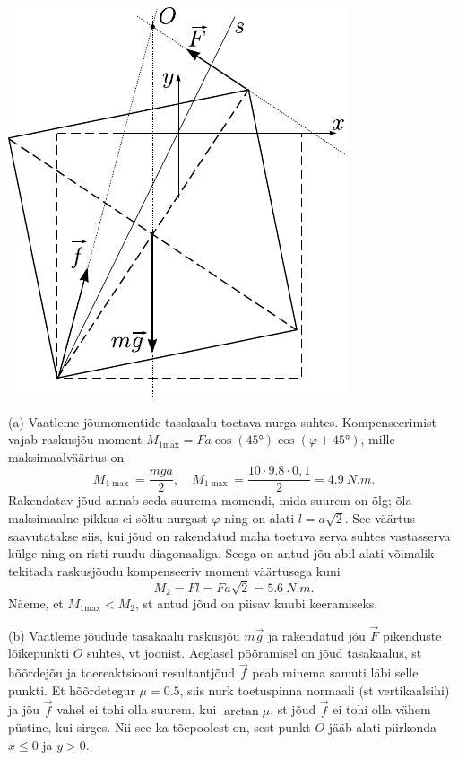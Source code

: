 \documentclass[10pt, twoside]{article}
\begin{document}
{\begin{center}
	\includegraphics[height=0.6\textheight]{2007-v2g-09-lah}
\end{center}

(a) Vaatleme jõumomentide tasakaalu toetava nurga suhtes. Kompenseerimist vajab raskusjõu moment $M_{1 \mathrm{max}} = F a \cos (\ang{45}) \cos (\varphi + \ang{45})$, mille maksimaalväärtus on 
\[
M_{1 \max }=\frac{m g a}{2}, \quad M_{1 \max }=\frac{10 \cdot \num{9,8} \cdot 0,1}{2}=\SI{4,9}{N.m}.
\]
Rakendatav jõud annab seda suurema momendi, mida suurem on õlg; õla maksimaalne pikkus ei sõltu nurgast $\varphi$ ning on alati $l = a \sqrt 2$. See väärtus saavutatakse siis, kui jõud on rakendatud maha toetuva serva suhtes vastasserva külge ning on risti ruudu diagonaaliga. Seega on antud jõu abil alati võimalik tekitada raskusjõudu kompenseeriv moment väärtusega kuni
\[
M_{2}=F l=F a \sqrt{2} = \SI{5.6}{N.m}.
\]
Näeme, et $M_{1 \mathrm{max}} < M_2$, st antud jõud on piisav kuubi keeramiseks.


(b) Vaatleme jõudude tasakaalu raskusjõu $m\vec g$ ja rakendatud jõu $\vec F$ pikenduste lõikepunkti $O$ suhtes, vt joonist. Aeglasel pööramisel on jõud tasakaalus, st hõõrdejõu ja toereaktsiooni resultantjõud $\vec f$ peab minema samuti läbi selle punkti. Et hõõrdetegur $\mu = \num{0,5}$, siis nurk toetuspinna normaali (st vertikaalsihi) ja jõu $\vec f$ vahel ei tohi olla suurem, kui $\arctan \mu$, st jõud $\vec f$ ei tohi olla vähem püstine, kui sirges. Nii see ka tõepoolest on, sest punkt $O$ jääb alati piirkonda $x \leq 0$ ja $y > 0$. 

}
\end{document}
